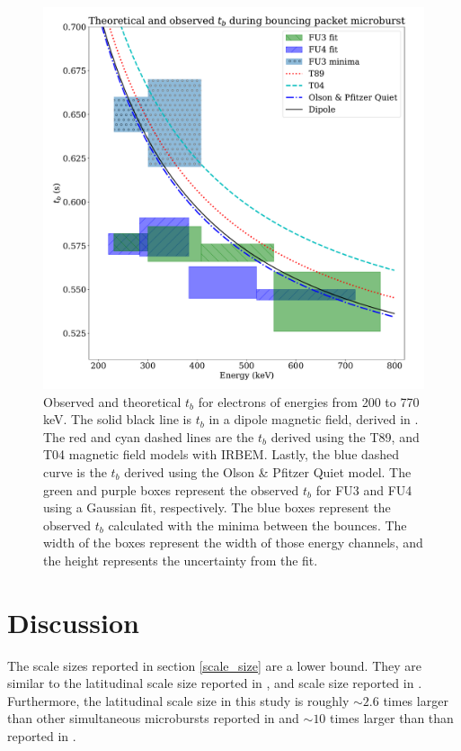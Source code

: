 \documentclass[draft,linenumbers]{agujournal}
\begin{document}
\begin{figure}
\includegraphics[width=\textwidth]{detrended_bounce_period_boxed_adj.pdf}
\caption{Observed and theoretical $t_b$ for electrons of energies from 200 to 770 keV. The solid black line is $t_b$ in a dipole magnetic field, derived in \citet{Schulz74}. The red and cyan dashed lines are the $t_b$ derived using the T89, and T04 magnetic field models with IRBEM. Lastly, the blue dashed curve is the $t_b$ derived using the Olson \& Pfitzer Quiet model. The green and purple boxes represent the observed $t_b$ for FU3 and FU4 using a Gaussian fit, respectively. The blue boxes represent the observed $t_b$ calculated with the minima between the bounces. The width of the boxes represent the width of those energy channels, and the height represents the uncertainty from the fit.}
\label{tb_plot}
\end{figure}

\section{Discussion} \label{discussion}
The scale sizes reported in section \ref{scale_size} are a lower bound. They are similar to the latitudinal scale size reported in \citet{Blake96}, and scale size reported in \citet{Parks1967}. Furthermore, the latitudinal scale size in this study is roughly $\sim 2.6$ times larger than other simultaneous microbursts reported in \citet{Crew16} and $\sim 10$ times larger than than reported in \citet{Dietrich10}.
\end{document}

